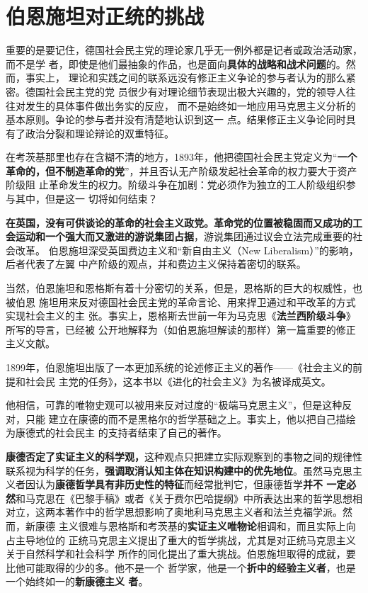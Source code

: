 \section{伯恩施坦对正统的挑战}
重要的是要记住，德国社会民主党的理论家几乎无一例外都是记者或政治活动家，而不是学
者，即使是他们最抽象的作品，也是面向\textbf{具体的战略和战术问题}的。然而，事实上，
理论和实践之间的联系远没有修正主义争论的参与者认为的那么紧密。德国社会民主党的党
员很少有对理论细节表现出极大兴趣的，党的领导人往往对发生的具体事件做出务实的反应，
而不是始终如一地应用马克思主义分析的基本原则。争论的参与者并没有清楚地认识到这一
点。结果修正主义争论同时具有了政治分裂和理论辩论的双重特征。

在考茨基那里也存在含糊不清的地方，1893年，他把德国社会民主党定义为“\textbf{一个
  革命的，但不制造革命的党}”，并且否认无产阶级发起社会革命的权力要大于资产阶级阻
止革命发生的权力。阶级斗争在加剧：党必须作为独立的工人阶级组织参与其中，但是这一
切将如何结束？

\textbf{在英国，没有可供谈论的革命的社会主义政党。革命党的位置被稳固而又成功的工
  会运动和一个强大而又激进的游说集团占据}，游说集团通过议会立法完成重要的社会改革。
伯恩施坦深受英国费边主义和“新自由主义（New Liberalism）”的影响，后者代表了左翼
中产阶级的观点，并和费边主义保持着密切的联系。

当然，伯恩施坦和恩格斯有着十分密切的关系，但是，恩格斯的巨大的权威性，也被伯恩
施坦用来反对德国社会民主党的革命言论、用来捍卫通过和平改革的方式实现社会主义的主
张。事实上，恩格斯去世前一年为马克思《\textbf{法兰西阶级斗争}》所写的导言，已经被
公开地解释为（如伯恩施坦解读的那样）第一篇重要的修正主义文献。

1899年，伯恩施坦出版了一本更加系统的论述修正主义的著作——《社会主义的前提和社会民
主党的任务》，这本书以《进化的社会主义》为名被译成英文。

他相信，可靠的唯物史观可以被用来反对过度的“极端马克思主义”，但是这种反对，只能
建立在康德的而不是黑格尔的哲学基础之上。事实上，他以把自己描绘为康德式的社会民主
的支持者结束了自己的著作。

\textbf{康德否定了实证主义的科学观，}这种观点只把建立实际观察到的事物之间的规律性
联系视为科学的任务，\textbf{强调取消认知主体在知识构建中的优先地位}。虽然马克思主
义者因认为\textbf{康德哲学具有非历史性的特征}而经常批判它，但康德哲学\textbf{并不
  一定必然}和马克思在《巴黎手稿》或者《关于费尔巴哈提纲》中所表达出来的哲学思想相
对立，这两本著作中的哲学思想影响了奥地利马克思主义者和法兰克福学派。然而，新康德
主义很难与恩格斯和考茨基的\textbf{实证主义唯物论}相调和，而且实际上向占主导地位的
正统马克思主义提出了重大的哲学挑战，尤其是对正统马克思主义关于自然科学和社会科学
所作的同化提出了重大挑战。伯恩施坦取得的成就，要比他可能取得的少的多。他不是一个
哲学家，他是一个\textbf{折中的经验主义者}，也是一个始终如一的\textbf{新康德主义
  者}。

